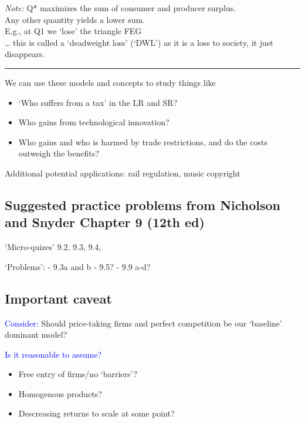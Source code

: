 \documentclass[]{article}
\providecommand{\tightlist}{%
  \setlength{\itemsep}{0pt}\setlength{\parskip}{0pt}}
\begin{document}
\emph{Note:} Q* maximizes the sum of consumer and producer surplus.\\
Any other quantity yields a lower sum.\\
E.g., at Q1 we `lose' the triangle FEG\\
\ldots{} this is called a `deadweight loss' (`DWL') as it is a loss to
society, it just disappears.

\begin{center}\rule{0.5\linewidth}{\linethickness}\end{center}

We can use these models and concepts to study things like

\begin{itemize}
\tightlist
\item
  `Who suffers from a tax' in the LR and SR?
\item
  Who gains from technological innovation?
\item
  Who gains and who is harmed by trade restrictions, and do the costs
  outweigh the benefits?
\end{itemize}

Additional potential applications: rail regulation, music copyright

\hypertarget{suggested-practice-problems-from-nicholson-and-snyder-chapter-9-12th-ed}{%
\subsection{Suggested practice problems from Nicholson and Snyder
Chapter 9 (12th
ed)}\label{suggested-practice-problems-from-nicholson-and-snyder-chapter-9-12th-ed}}

`Micro-quizes' 9.2, 9.3, 9.4,

`Problems': - 9.3a and b - 9.5? - 9.9 a-d?

\hypertarget{important-caveat}{%
\subsection{Important caveat}\label{important-caveat}}

\textcolor{blue}{Consider:} Should price-taking firms and perfect
competition be our `baseline' dominant model?

\textcolor{blue}{Is it reasonable to assume?}

\begin{itemize}
\item
  Free entry of firms/no `barriers'?
\item
  Homogenous products?
\item
  Descreasing returns to scale at some point?
\end{itemize}
\end{document}
